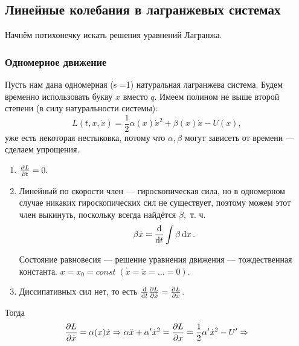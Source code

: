 \subsection{Линейные колебания в лагранжевых системах}
Начнём потихонечку искать решения уравнений Лагранжа.
\subsubsection{Одномерное движение}
Пусть нам дана одномерная (s =1) натуральная лагранжева система. Будем временно использовать букву $x $ вместо $q$. Имеем полином не выше второй степени (в силу натуральности системы):
\[L(t, x, \dot{x})  = \frac{1}{2} \alpha(x) \dot{x}^2 + \beta(x) \dot{x} - U(x),\]
уже есть некоторая нестыковка, потому что $\alpha, \beta$ могут зависеть от времени --- сделаем упрощения.
\begin{enumerate}
\item $\pdv{L}{t} = 0.$
\item Линейный по скорости член --- гироскопическая сила, но в одномерном случае никаких гироскопических сил не существует, поэтому можем этот член выкинуть, поскольку всегда найдётся $\beta,$ т. ч.
\[\beta \dot{x} = \dv{t} \int \beta \dd{x}.\]
\begin{dfn}
Состояние равновесия --- решение уравнения движения --- тождественная константа.
$x = x_0 = const\; (\dot{x} = \ddot{x} = \dots = 0).$
\end{dfn}
\item Диссипативных сил нет, то есть $\dv{t} \pdv{L}{\dot{x}} = \pdv{L}{x}$.
\end{enumerate}
Тогда 
\[\pdv{L}{\dot{x}} = \alpha(x) \dot{x} \Rightarrow \alpha \ddot{x} + \alpha' \dot{x}^2 = \pdv{L}{x} = \frac{1}{2} \alpha' \dot{x}^2 - U' \Rightarrow \]

